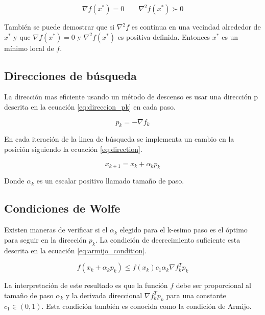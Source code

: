 \begin{equation}
    \nabla f(x^*) = 0 \qquad \nabla^2 f(x^*) \succ 0 \label{eq:hess_grad_function}
\end{equation}

También se puede demostrar que si $\nabla^2 f$ es continua en una vecindad alrededor de $x^*$ y que $\nabla f(x^*)=0$ y $\nabla^2 f(x^*)$ es positiva definida. Entonces $x^*$ es un mínimo local de $f$.

\subsection{Direcciones de búsqueda}

La dirección mas eficiente usando un método de descenso es usar una dirección p descrita en la ecuación \ref{eq:direccion_pk} en cada paso.

\begin{equation}
    p_k = - \nabla f_k \label{eq:direccion_pk}
\end{equation}

En cada iteración de la linea de búsqueda se implementa un cambio en la posición siguiendo la ecuación \ref{eq:direction}.

\begin{equation}
    x_{k+1} = x_{k} + \alpha_k p_k \label{eq:direction}
\end{equation}

Donde $\alpha_k$ es un escalar positivo llamado tamaño de paso.


\subsection{Condiciones de Wolfe \label{sec:wolfe}}

Existen maneras de verificar si el $\alpha_k$ elegido para el k-esimo paso es el óptimo para seguir en la dirección $p_k$. La condición de decrecimiento suficiente esta descrita en la ecuación \ref{eq:armijo_condition}.

\begin{equation}
    f(x_k+\alpha_kp_k) \leq f(x_k)c_1 \alpha_k \nabla f_k^T p_k \label{eq:armijo_condition}
\end{equation}

La interpretación de este resultado es que la función $f$ debe ser proporcional al tamaño de paso $\alpha_k$ y la derivada direccional $\nabla f_k^T p_k$ para una constante $c_1 \in (0,1)$. Esta condición también es conocida como la condición de Armijo.

